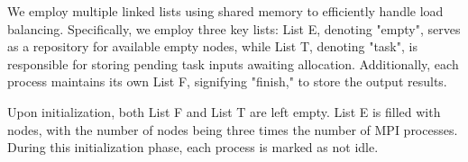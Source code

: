 We employ multiple linked lists using shared memory to efficiently handle load balancing. Specifically, we employ three key lists: List E, denoting "empty", serves as a repository for available empty nodes, while List T, denoting "task", is responsible for storing pending task inputs awaiting allocation. Additionally, each process maintains its own List F, signifying "finish," to store the output results.

Upon initialization, both List F and List T are left empty. List E is filled with nodes, with the number of nodes being three times the number of MPI processes. During this initialization phase, each process is marked as not idle.


